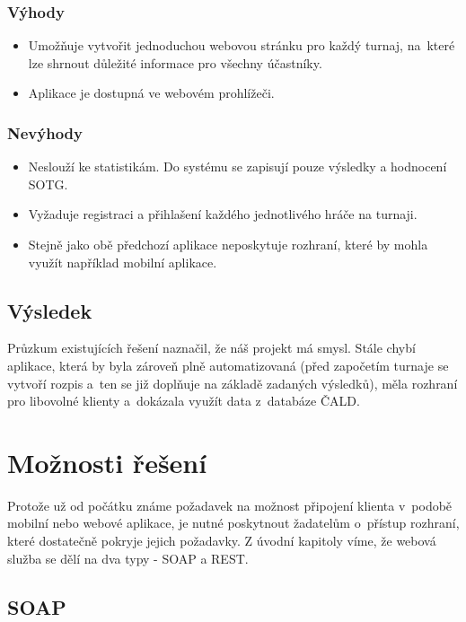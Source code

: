 \subsubsection*{Výhody}
\begin{itemize}
  \item Umožňuje vytvořit jednoduchou webovou stránku pro každý turnaj, na~které lze shrnout důležité informace pro všechny účastníky.
  \item Aplikace je dostupná ve webovém prohlížeči.
\end{itemize}

\subsubsection*{Nevýhody}
\begin{itemize}
  \item Neslouží ke statistikám. Do systému se zapisují pouze výsledky a hodnocení SOTG.
  \item Vyžaduje registraci a přihlašení každého jednotlivého hráče na turnaji.
  \item Stejně jako obě předchozí aplikace neposkytuje rozhraní, které by mohla využít například mobilní aplikace.
\end{itemize}

\subsection{Výsledek}

Průzkum existujících řešení naznačil, že náš projekt má smysl. Stále chybí aplikace,
která by byla zároveň plně automatizovaná (před započetím turnaje se vytvoří rozpis a~ten se
již doplňuje na základě zadaných výsledků), měla rozhraní pro libovolné klienty
a~dokázala využít data z~databáze ČALD.

\section{Možnosti řešení}

Protože už od počátku známe požadavek na možnost připojení klienta v~podobě mobilní nebo webové aplikace,
je nutné poskytnout žadatelům o~přístup rozhraní, které dostatečně pokryje jejich požadavky.
Z úvodní kapitoly víme, že webová služba se dělí na dva typy - SOAP a REST.

\subsection{SOAP}

